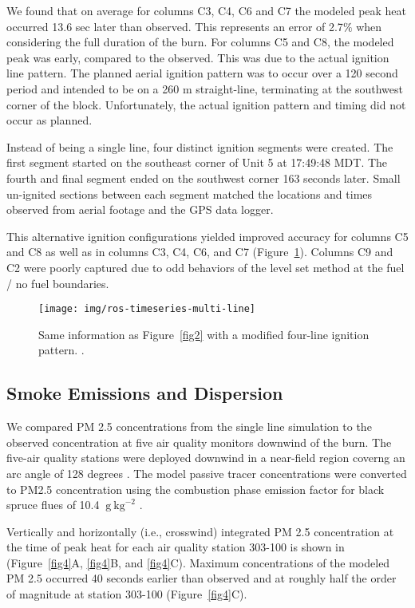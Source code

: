 \documentclass[preprints,article,accept,moreauthors,pdftex]{Definitions/mdpi}
\begin{document}
We found that on average for columns C3, C4, C6 and C7 the modeled peak heat occurred 13.6 sec later than observed. This represents an error of 2.7$\%$ when considering the full duration of the burn. For columns C5 and C8, the modeled peak was early,  compared to the observed. This was due to the actual ignition line pattern. The planned aerial ignition pattern was to occur over a 120 second period and intended to be on a 260 m straight-line, terminating at the southwest corner of the block. Unfortunately, the actual ignition pattern and timing did not occur as planned.

Instead of being a single line, four distinct ignition segments were created. The first segment started on the southeast corner of Unit 5 at 17:49:48 MDT. The fourth and final segment ended on the southwest corner 163 seconds later. Small un-ignited sections between each segment matched the locations and times observed from aerial footage and the GPS data logger.

This alternative ignition configurations yielded improved accuracy for columns C5 and C8 as well as in columns C3, C4, C6, and C7 (Figure~\ref{fig3}). Columns C9 and C2 were poorly captured due to odd behaviors of the level set method at the fuel / no fuel boundaries.

\begin{figure}[H]
\centering
 \texttt{[image: img/ros-timeseries-multi-line]}
 \caption{Same information as Figure~\ref{fig2} with a modified four-line ignition pattern. .\label{fig3}}
 \end{figure}

\subsection{Smoke Emissions and Dispersion}

We compared PM 2.5 concentrations from the single line simulation to the observed concentration at five air quality monitors downwind of the burn. The five-air quality stations were deployed downwind in a near-field region coverng an arc angle of 128 degrees \cite{huda_study_2020}. The model passive tracer concentrations were converted to PM2.5 concentration using the combustion phase emission factor for black spruce flues of 10.4 $\mathrm{~g}\mathrm{~kg}^{-2}$ \cite{prichard_wildland_2020}.


Vertically and horizontally (i.e., crosswind) integrated PM 2.5 concentration at the time of peak heat for each air quality station 303-100 is shown in  (Figure~\ref{fig4}A, \ref{fig4}B, and \ref{fig4}C). Maximum concentrations of the modeled PM 2.5 occurred 40 seconds earlier than observed and at roughly half the order of magnitude at station 303-100 (Figure~\ref{fig4}C).
\end{document}
